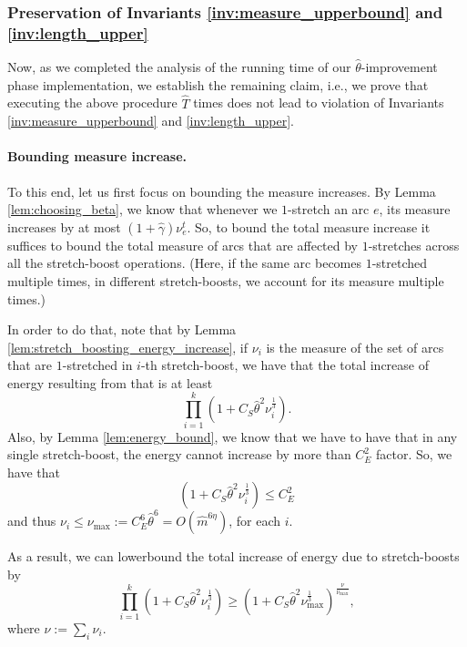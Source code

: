 \documentclass[11pt, letterpaper]{article}
\newcommand{\cenergy}{C_{E}}
\newcommand{\cincrease}{C_{S}}
\newcommand{\hm}{\widehat{m}}
\newcommand{\hT}{\widehat{T}}
\newcommand{\hgamma}{\hat{\gamma}}
\newcommand{\htheta}{\hat{\theta}}
\begin{document}
\subsubsection*{Preservation of Invariants \ref{inv:measure_upperbound} and \ref{inv:length_upper}}


Now, as we completed the analysis of the running time of our $\htheta$-improvement phase implementation, we establish the remaining claim, i.e., we prove that executing the above procedure $\hT$ times does not lead to violation of Invariants \ref{inv:measure_upperbound} and \ref{inv:length_upper}. 

\paragraph{Bounding measure increase.}

To this end, let us first focus on bounding the measure increases. By Lemma \ref{lem:choosing_beta}, we know that whenever we $1$-stretch an arc $e$, its measure increases by at most $(1+\hgamma)\nu_e^t$. So, to bound the total measure increase it suffices to bound the total measure of arcs that are affected by $1$-stretches across all the stretch-boost operations. (Here, if the same arc becomes $1$-stretched multiple times, in different stretch-boosts, we account for its measure multiple times.) 

In order to do that, note that by Lemma \ref{lem:stretch_boosting_energy_increase}, if $\nu_i$ is the measure of the set of arcs that are $1$-stretched in $i$-th stretch-boost, we have that the total increase of energy resulting from that is at least
\[
\prod_{i=1}^{k} (1+\cincrease\htheta^{2}\nu_i^{\frac{1}{3}}).
\]
Also, by Lemma \ref{lem:energy_bound}, we know that we have to have that in any single stretch-boost, the energy cannot increase by more than $\cenergy^2$ factor. So, we have that
\[
(1+\cincrease\htheta^{2}\nu_i^{\frac{1}{3}})\leq \cenergy^2
\]
and thus $\nu_i\leq \nu_{\max}:=\cenergy^6 \htheta^6=O(\hm^{6\eta})$, for each $i$. 

As a result, we can lowerbound the total increase of energy due to stretch-boosts by
\[
\prod_{i=1}^{k} (1+\cincrease\htheta^{2}\nu_i^{\frac{1}{3}})\geq (1+\cincrease\htheta^{2}\nu_{\max}^{\frac{1}{3}})^{\frac{\nu}{\nu_{\max}}},
\]
where $\nu:=\sum_i \nu_i$. 
\end{document}

